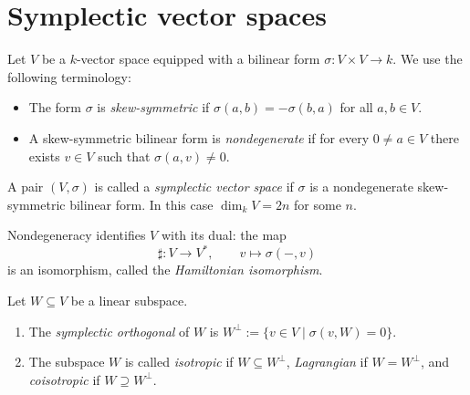 \providecommand{\C}{\mathbb{C}}
\providecommand{\A}{\mathbb{A}}
\providecommand{\Z}{\mathbb{Z}}
\providecommand{\Spec}{\operatorname{Spec}}
\providecommand{\Supp}{\operatorname{Supp}}
\providecommand{\Ch}{\operatorname{Ch}}
\providecommand{\gr}{\operatorname{gr}}
\providecommand{\Ann}{\operatorname{Ann}}
\providecommand{\rad}{\operatorname{rad}}
\providecommand{\Hom}{\operatorname{Hom}}
\providecommand{\End}{\operatorname{End}}
\providecommand{\D}{\mathcal{D}}
\providecommand{\T}{\mathcal{T}}
\providecommand{\Poisson}{\mathrm{P}}
\providecommand{\Rees}{\operatorname{R}}

\newcommand{\Tv}{\mathcal{T}}
\newcommand{\sm}{\mathrm{sm}}

\section{Symplectic vector spaces}

Let $V$ be a $k$-vector space equipped with a bilinear form
$\sigma\colon V\times V\to k$.  We use the following terminology:
\begin{itemize}
    \item The form $\sigma$ is \emph{skew-symmetric} if
          $\sigma(a,b)=-\sigma(b,a)$ for all $a,b\in V$.
    \item A skew-symmetric bilinear form is \emph{nondegenerate} if for every
          $0\ne a\in V$ there exists $v\in V$ such that $\sigma(a,v)\ne 0$.
\end{itemize}
A pair $(V,\sigma)$ is called a \emph{symplectic vector space} if $\sigma$
is a nondegenerate skew-symmetric bilinear form.  In this case
$\dim_k V=2n$ for some $n$.

Nondegeneracy identifies $V$ with its dual: the map
\[
    \sharp \colon V \longrightarrow V^\ast,\qquad
    v \longmapsto \sigma(-,v)
\]
is an isomorphism, called the \emph{Hamiltonian isomorphism}.

\begin{definition}[Def.~7.1]
    Let $W\subseteq V$ be a linear subspace.
    \begin{enumerate}
        \item The \emph{symplectic orthogonal} of $W$ is
              $W^\perp:=\{v\in V\mid \sigma(v,W)=0\}$.
        \item The subspace $W$ is called \emph{isotropic} if $W\subseteq W^\perp$,
              \emph{Lagrangian} if $W=W^\perp$, and \emph{coisotropic} if
              $W\supseteq W^\perp$.
    \end{enumerate}
\end{definition}

